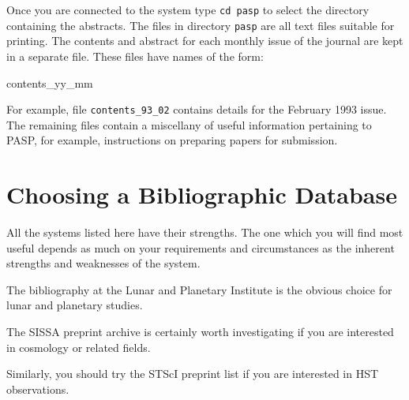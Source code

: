 \documentclass[twoside,11pt,nolof]{starlink}
\begin{document}
Once you are connected to the system type \verb-cd pasp- to select the
directory containing the abstracts. The files in directory \verb-pasp-
are all text files suitable for printing. The contents and abstract for
each monthly issue of the journal are kept in a separate file. These
files have names of the form:

\begin{terminalv}
contents_yy_mm
\end{terminalv}

For example, file \verb-contents_93_02- contains details for the
February 1993 issue. The remaining files contain a miscellany of useful
information pertaining to PASP, for example, instructions on preparing
papers for submission.


\section{Choosing a Bibliographic Database
}

All the systems listed here have their strengths. The one which you will
find most useful depends as much on your requirements and circumstances
as the inherent strengths and weaknesses of the system.

The bibliography at the Lunar and Planetary Institute is the obvious
choice for lunar and planetary studies.

The SISSA preprint archive is certainly worth investigating if you are
interested in cosmology or related fields.

Similarly, you should try the STScI preprint list if you are interested
in HST observations.
\end{document}
